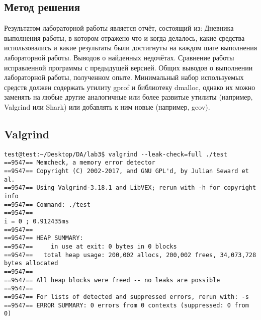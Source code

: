 \documentclass[pdf, unicode, 12pt, a4paper,oneside,fleqn]{article}
\begin{document}
\subsection*{Метод решения}
Результатом лабораторной работы является отчёт, состоящий из:
Дневника выполнения работы, в котором отражено что и когда делалось, какие средства использовались и какие результаты были достигнуты на каждом шаге выполнения лабораторной работы. Выводов о найденных недочётах. Сравнение работы исправленной программы с предыдущей версией. Общих выводов о выполнении лабораторной работы, полученном опыте.
Минимальный набор используемых средств должен содержать утилиту gprof и библиотеку dmalloc, однако их можно заменять на любые другие аналогичные или более развитые утилиты (например, Valgrind или Shark) или добавлять к ним новые (например, geov).


\subsection*{Valgrind}
\begin{lstlisting}
test@test:~/Desktop/DA/lab3$ valgrind --leak-check=full ./test
==9547== Memcheck, a memory error detector
==9547== Copyright (C) 2002-2017, and GNU GPL'd, by Julian Seward et al.
==9547== Using Valgrind-3.18.1 and LibVEX; rerun with -h for copyright info
==9547== Command: ./test
==9547== 
i = 0 ; 0.912435ms
==9547== 
==9547== HEAP SUMMARY:
==9547==     in use at exit: 0 bytes in 0 blocks
==9547==   total heap usage: 200,002 allocs, 200,002 frees, 34,073,728 bytes allocated
==9547== 
==9547== All heap blocks were freed -- no leaks are possible
==9547== 
==9547== For lists of detected and suppressed errors, rerun with: -s
==9547== ERROR SUMMARY: 0 errors from 0 contexts (suppressed: 0 from 0)
\end{lstlisting}
\end{document}

